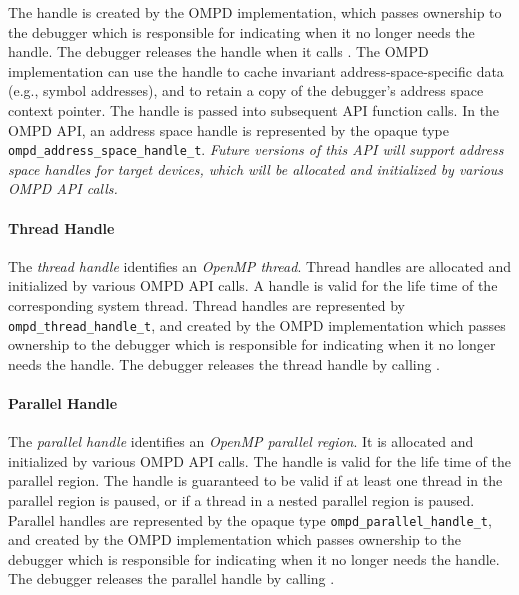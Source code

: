 The handle is created by the OMPD implementation, which passes ownership
to the debugger which is responsible for indicating when it no longer
needs the handle.
The debugger releases the handle when it calls
.
The OMPD implementation can use the handle to cache invariant
address-space-specific data (e.g., symbol addresses), and to retain a copy of 
the
debugger's address space context pointer.
The handle is passed into subsequent API function calls.
In the OMPD API, an address space handle is represented by the opaque type
\texttt{ompd\_address\_space\_handle\_t}.
%
\emph{Future versions of this API will support address space handles
for target devices, which will be allocated and initialized by various
OMPD API calls.}

\paragraph{Thread Handle}
The \emph{thread handle} identifies an \emph{OpenMP thread}.
Thread handles are allocated and initialized by various OMPD API calls.
A handle is valid for the life time of the corresponding system thread.
Thread handles are represented by \texttt{ompd\_thread\_handle\_t},
and created by the OMPD implementation which passes ownership to the
debugger which is responsible for indicating when it no longer
needs the handle.
The debugger releases the thread handle by calling
.

\paragraph{Parallel Handle}
The \emph{parallel handle} identifies an \emph{OpenMP parallel region}.
It is allocated and initialized by various OMPD API calls.
The handle is valid for the life time of the parallel region.
The handle is guaranteed to be valid if at least one thread
in the parallel region is paused, or if a thread in a nested
parallel region is paused.
Parallel handles are represented by the opaque type
\texttt{ompd\_parallel\_handle\_t}, and created by the OMPD implementation
which passes ownership to the debugger which is responsible for
indicating when it no longer needs the handle.
The debugger releases the parallel handle by calling
.


